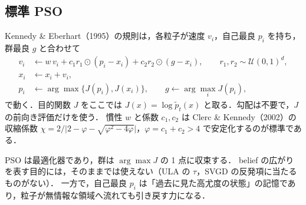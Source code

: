 \documentclass[a4paper,11pt]{article}
\newcommand{\ptil}{\tilde p_t}
\begin{document}
\subsection{標準 PSO}
Kennedy \& Eberhart（1995）の規則は，各粒子が速度 $v_i$，自己最良 $p_i$ を持ち，群最良 $g$ と合わせて
\begin{align}
  v_i &\leftarrow w\, v_i + c_1 r_1 \odot (p_i - x_i) + c_2 r_2 \odot (g - x_i), \qquad r_1, r_2 \sim \mathcal U(0,1)^d, \label{eq:pso-v}\\
  x_i &\leftarrow x_i + v_i, \label{eq:pso-x}\\
  p_i &\leftarrow \arg\max\{ J(p_i), J(x_i) \}, \qquad g \leftarrow \arg\max_i J(p_i),
\end{align}
で動く．目的関数 $J$ をここでは $J(x) = \log \ptil(x)$ と取る．勾配は不要で，$J$ の前向き評価だけを使う．
慣性 $w$ と係数 $c_1, c_2$ は Clerc \& Kennedy（2002）の収縮係数
$\chi = 2 / \lvert 2 - \varphi - \sqrt{\varphi^2 - 4\varphi} \rvert$，$\varphi = c_1 + c_2 > 4$
で安定化するのが標準である．

PSO は最適化器であり，群は $\arg\max J$ の 1 点に収束する．
belief の広がりを表す目的には，そのままでは使えない（ULA の $\tau$，SVGD の反発項に当たるものがない）．
一方で，自己最良 $p_i$ は「過去に見た高尤度の状態」の記憶であり，粒子が無情報な領域へ流れても引き戻す力になる．
\end{document}
